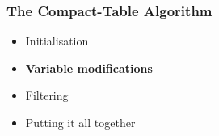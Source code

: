 \documentclass{beamer}
\begin{document}


\begin{frame}
  \frametitle{The Compact-Table Algorithm}
  \begin{itemize}
  \item {\color{gray}Initialisation}
  \item \textbf{Variable modifications}
  \item {\color{gray}Filtering}
  \item {\color{gray}Putting it all together}
  \end{itemize}
\end{frame}
\end{document}
